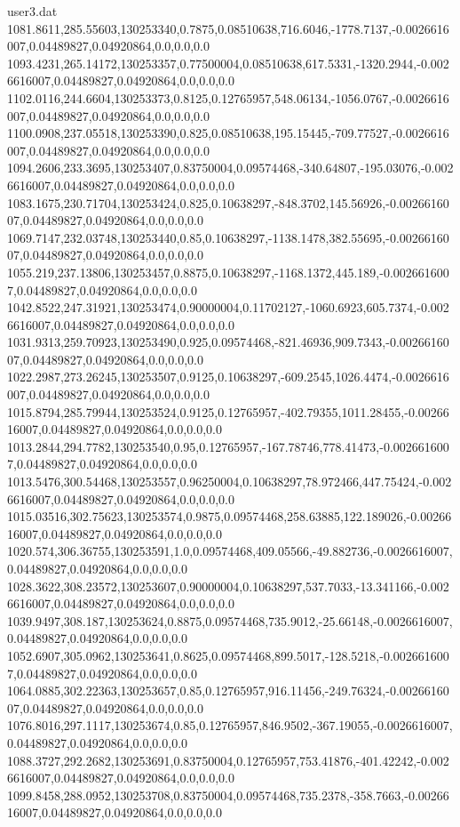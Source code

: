 \begin{filecontents}{user3.dat}
1081.8611,285.55603,130253340,0.7875,0.08510638,716.6046,-1778.7137,-0.0026616007,0.04489827,0.04920864,0.0,0.0,0.0
1093.4231,265.14172,130253357,0.77500004,0.08510638,617.5331,-1320.2944,-0.0026616007,0.04489827,0.04920864,0.0,0.0,0.0
1102.0116,244.6604,130253373,0.8125,0.12765957,548.06134,-1056.0767,-0.0026616007,0.04489827,0.04920864,0.0,0.0,0.0
1100.0908,237.05518,130253390,0.825,0.08510638,195.15445,-709.77527,-0.0026616007,0.04489827,0.04920864,0.0,0.0,0.0
1094.2606,233.3695,130253407,0.83750004,0.09574468,-340.64807,-195.03076,-0.0026616007,0.04489827,0.04920864,0.0,0.0,0.0
1083.1675,230.71704,130253424,0.825,0.10638297,-848.3702,145.56926,-0.0026616007,0.04489827,0.04920864,0.0,0.0,0.0
1069.7147,232.03748,130253440,0.85,0.10638297,-1138.1478,382.55695,-0.0026616007,0.04489827,0.04920864,0.0,0.0,0.0
1055.219,237.13806,130253457,0.8875,0.10638297,-1168.1372,445.189,-0.0026616007,0.04489827,0.04920864,0.0,0.0,0.0
1042.8522,247.31921,130253474,0.90000004,0.11702127,-1060.6923,605.7374,-0.0026616007,0.04489827,0.04920864,0.0,0.0,0.0
1031.9313,259.70923,130253490,0.925,0.09574468,-821.46936,909.7343,-0.0026616007,0.04489827,0.04920864,0.0,0.0,0.0
1022.2987,273.26245,130253507,0.9125,0.10638297,-609.2545,1026.4474,-0.0026616007,0.04489827,0.04920864,0.0,0.0,0.0
1015.8794,285.79944,130253524,0.9125,0.12765957,-402.79355,1011.28455,-0.0026616007,0.04489827,0.04920864,0.0,0.0,0.0
1013.2844,294.7782,130253540,0.95,0.12765957,-167.78746,778.41473,-0.0026616007,0.04489827,0.04920864,0.0,0.0,0.0
1013.5476,300.54468,130253557,0.96250004,0.10638297,78.972466,447.75424,-0.0026616007,0.04489827,0.04920864,0.0,0.0,0.0
1015.03516,302.75623,130253574,0.9875,0.09574468,258.63885,122.189026,-0.0026616007,0.04489827,0.04920864,0.0,0.0,0.0
1020.574,306.36755,130253591,1.0,0.09574468,409.05566,-49.882736,-0.0026616007,0.04489827,0.04920864,0.0,0.0,0.0
1028.3622,308.23572,130253607,0.90000004,0.10638297,537.7033,-13.341166,-0.0026616007,0.04489827,0.04920864,0.0,0.0,0.0
1039.9497,308.187,130253624,0.8875,0.09574468,735.9012,-25.66148,-0.0026616007,0.04489827,0.04920864,0.0,0.0,0.0
1052.6907,305.0962,130253641,0.8625,0.09574468,899.5017,-128.5218,-0.0026616007,0.04489827,0.04920864,0.0,0.0,0.0
1064.0885,302.22363,130253657,0.85,0.12765957,916.11456,-249.76324,-0.0026616007,0.04489827,0.04920864,0.0,0.0,0.0
1076.8016,297.1117,130253674,0.85,0.12765957,846.9502,-367.19055,-0.0026616007,0.04489827,0.04920864,0.0,0.0,0.0
1088.3727,292.2682,130253691,0.83750004,0.12765957,753.41876,-401.42242,-0.0026616007,0.04489827,0.04920864,0.0,0.0,0.0
1099.8458,288.0952,130253708,0.83750004,0.09574468,735.2378,-358.7663,-0.0026616007,0.04489827,0.04920864,0.0,0.0,0.0

\end{filecontents}
